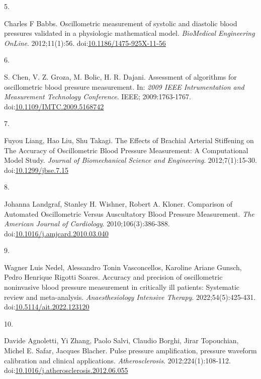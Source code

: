 \documentclass[
  12pt,
  letterpaper,
  openany,
  oneside]{book}
\newlength{\cslhangindent}
\newlength{\csllabelwidth}
\newenvironment{CSLReferences}[2] %
 {\begin{list}{}{%
  \setlength{\itemindent}{0pt}
  \setlength{\leftmargin}{0pt}
  \setlength{\parsep}{0pt}
  \ifodd #1
   \setlength{\leftmargin}{\cslhangindent}
   \setlength{\itemindent}{-1\cslhangindent}
  \fi
  \setlength{\itemsep}{#2\baselineskip}}}
 {\end{list}}
\newcommand{\CSLLeftMargin}[1]{\parbox[t]{\csllabelwidth}{\strut#1\strut}}
\newcommand{\CSLRightInline}[1]{\parbox[t]{\linewidth - \csllabelwidth}{\strut#1\strut}}
\begin{document}
\begin{CSLReferences}{0}{1}
\CSLLeftMargin{5. }%
\CSLRightInline{Charles F Babbs. Oscillometric measurement of systolic
and diastolic blood pressures validated in a physiologic mathematical
model. \emph{BioMedical Engineering OnLine}. 2012;11(1):56.
doi:\href{https://doi.org/10.1186/1475-925X-11-56}{10.1186/1475-925X-11-56}}

\CSLLeftMargin{6. }%
\CSLRightInline{S. Chen, V. Z. Groza, M. Bolic, H. R. Dajani. Assessment
of algorithms for oscillometric blood pressure measurement. In:
\emph{2009 {IEEE} {Intrumentation} and {Measurement} {Technology}
{Conference}}. IEEE; 2009:1763-1767.
doi:\href{https://doi.org/10.1109/IMTC.2009.5168742}{10.1109/IMTC.2009.5168742}}

\CSLLeftMargin{7. }%
\CSLRightInline{Fuyou Liang, Hao Liu, Shu Takagi. The {Effects} of
{Brachial} {Arterial} {Stiffening} on {The} {Accuracy} of
{Oscillometric} {Blood} {Pressure} {Measurement}: {A} {Computational}
{Model} {Study}. \emph{Journal of Biomechanical Science and
Engineering}. 2012;7(1):15-30.
doi:\href{https://doi.org/10.1299/jbse.7.15}{10.1299/jbse.7.15}}

\CSLLeftMargin{8. }%
\CSLRightInline{Johanna Landgraf, Stanley H. Wishner, Robert A. Kloner.
Comparison of {Automated} {Oscillometric} {Versus} {Auscultatory}
{Blood} {Pressure} {Measurement}. \emph{The American Journal of
Cardiology}. 2010;106(3):386-388.
doi:\href{https://doi.org/10.1016/j.amjcard.2010.03.040}{10.1016/j.amjcard.2010.03.040}}

\CSLLeftMargin{9. }%
\CSLRightInline{Wagner Luis Nedel, Alessandro Tonin Vasconcellos,
Karoline Ariane Gunsch, Pedro Henrique Rigotti Soares. Accuracy and
precision of oscillometric noninvasive blood pressure measurement in
critically ill patients: Systematic review and meta-analysis.
\emph{Anaesthesiology Intensive Therapy}. 2022;54(5):425-431.
doi:\href{https://doi.org/10.5114/ait.2022.123120}{10.5114/ait.2022.123120}}

\CSLLeftMargin{10. }%
\CSLRightInline{Davide Agnoletti, Yi Zhang, Paolo Salvi, Claudio Borghi,
Jirar Topouchian, Michel E. Safar, Jacques Blacher. Pulse pressure
amplification, pressure waveform calibration and clinical applications.
\emph{Atherosclerosis}. 2012;224(1):108-112.
doi:\href{https://doi.org/10.1016/j.atherosclerosis.2012.06.055}{10.1016/j.atherosclerosis.2012.06.055}}


\end{CSLReferences}
\end{document}
